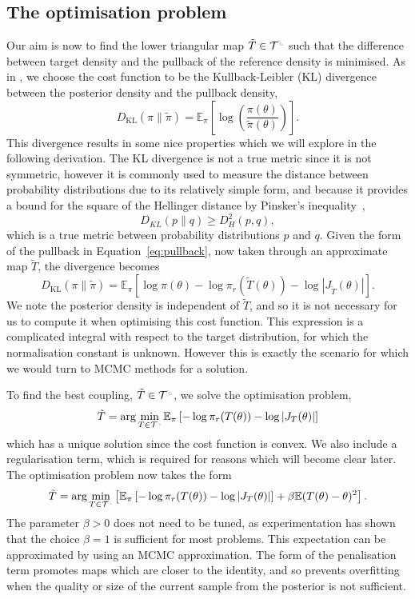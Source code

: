 \documentclass[final]{siamltex}
\newcommand{\ltri}{%
\,\resizebox{!}{0.25\baselineskip}{%
\begin{tikzpicture}%
\draw[line width=1mm](0,0) -- (0,2) -- (2,0)  -- (0,0);
\end{tikzpicture}%
}\xspace%
}%
\newcommand{\smallltri}{%
\,\resizebox{!}{0.15\baselineskip}{%
\begin{tikzpicture}%
\draw[line width=1mm](0,0) -- (0,2) -- (2,0)  -- (0,0);
\end{tikzpicture}%
}\xspace%
}%
\begin{document}
\subsection{The optimisation problem}
Our aim is now to find the lower triangular map $\tilde{T} \in
\mathcal{T}^{\ltri}$ such that the difference between target
density and the pullback of the reference density is minimised. As in
\cite{parno2014transport}, we choose the cost function
to be the Kullback-Leibler (KL) divergence between the posterior density and the pullback density,
\[
	D_\text{KL}(\pi\|\tilde{\pi}) =
		\mathbb{E}_\pi\left[\log\left(\frac{\pi(\theta)}{\tilde{\pi}(\theta)}\right)\right].
\]
This divergence results in some nice properties which we will explore in the following derivation. The KL divergence is not a true metric since it is not symmetric, however it is commonly used to measure the distance between probability distributions due to its relatively simple form, and because it provides a bound for the square of the Hellinger distance by Pinsker's inequality~\cite{pinsker1960information},
\[
	D_{KL}(p\|q) \geq D_H^2(p,q),
\]
which is a true metric between probability distributions $p$ and $q$.
Given the form of the pullback in Equation~\eqref{eq:pullback}, now taken through an approximate map $\tilde{T}$, the divergence becomes
\[
	D_\text{KL}(\pi\|\tilde{\pi}) = \mathbb{E}_\pi\left[\log\pi(\theta) - \log\pi_r(\tilde{T}(\theta)) -
		\log\left|J_{\tilde{T}}(\theta)\right|\right].
\]
We note the posterior density is independent of $\tilde{T}$, and so it is not necessary for us to compute it when optimising this cost function. This expression is a complicated integral with respect to the target distribution, for which the normalisation constant is unknown. However this is exactly the scenario for which we would turn to MCMC methods for a solution.

To find the best coupling, $\tilde{T} \in \mathcal{T}^{\ltri}$, we solve the optimisation problem,
\[
	\tilde{T} = \arg\min_{T \in \mathcal{T}^{\smallltri}} \mathbb{E}_\pi\left[-\log\pi_r(T(\theta)) -
		\log\left|J_T(\theta)\right|\right]
\]
which has a unique solution since the cost function is convex. We also include a regularisation term, which is required for reasons which will become clear later. The optimisation problem now takes the form
\begin{equation}\label{eq:gen_map_optim}
	\tilde{T} = \arg\min_{T\in\mathcal{T}^{\smallltri}} \left[
		 \mathbb{E}_\pi\left[-\log\pi_r(T(\theta)) -
		\log\left|J_T(\theta)\right|\right] + \beta\mathbb{E}(T(\theta)- \theta)^2 \right].
\end{equation}
The parameter $\beta>0$ does not need to be tuned, as experimentation has shown that the choice
$\beta=1$ is sufficient for most problems. This expectation can be
approximated by using an MCMC approximation. The form of the penalisation term promotes maps which are
closer to the identity, and so prevents overfitting when the quality
or size of the current sample from the posterior is not sufficient.
\end{document}
